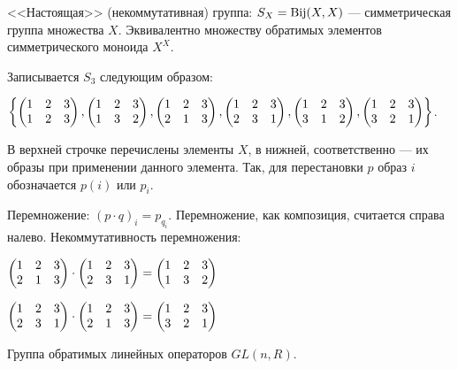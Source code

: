 \documentclass[a4paper]{report}
\begin{document}
{{            
        }

        \item <<Настоящая>> (некоммутативная) группа: $S_X = \operatorname{Bij}(X, X)$ --- симметрическая группа множества $X$.
        Эквивалентно множеству обратимых элементов симметрического моноида $X^X$.

        Записывается $S_3$ следующим образом:

        $\left\{\begin{pmatrix}1&2&3\\1&2&3\end{pmatrix}, \begin{pmatrix}1&2&3\\1&3&2\end{pmatrix}, \begin{pmatrix}1&2&3\\2&1&3\end{pmatrix}, \begin{pmatrix}1&2&3\\2&3&1\end{pmatrix}, \begin{pmatrix}1&2&3\\3&1&2\end{pmatrix}, \begin{pmatrix}1&2&3\\3&2&1\end{pmatrix}\right\}$.

        В верхней строчке перечислены элементы $X$, в нижней, соответственно --- их образы при применении данного элемента.
        Так, для перестановки $p$ образ $i$ обозначается $p(i)$ или $p_i$.

        Перемножение:
        $(p \cdot q)_i = p_{q_i}$. Перемножение, как композиция, считается справа налево.
        Некоммутативность перемножения:

        $\begin{pmatrix}1&2&3\\2&1&3\end{pmatrix} \cdot \begin{pmatrix}1&2&3\\2&3&1\end{pmatrix}=\begin{pmatrix}1&2&3\\1&3&2\end{pmatrix}$

        $\begin{pmatrix}1&2&3\\2&3&1\end{pmatrix} \cdot \begin{pmatrix}1&2&3\\2&1&3\end{pmatrix}=\begin{pmatrix}1&2&3\\3&2&1\end{pmatrix}$
        \item Группа обратимых линейных операторов $GL(n, R)$.

}
\end{document}
